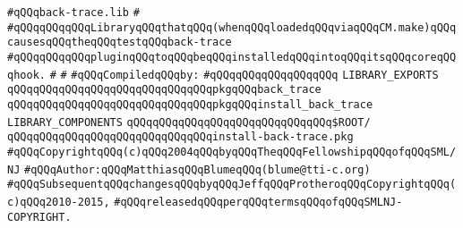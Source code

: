 \label{src/app/debug/back-trace.lib}
\verb|#qQQqback-trace.lib|\newline
\verb|#|\newline
\verb|#qQQqqQQqqQQqLibraryqQQqthatqQQq(whenqQQqloadedqQQqviaqQQqCM.make)qQQqcausesqQQqtheqQQqtestqQQqback-trace|\newline
\verb|#qQQqqQQqqQQqpluginqQQqtoqQQqbeqQQqinstalledqQQqintoqQQqitsqQQqcoreqQQqhook.|\newline
\verb|#|\newline
\verb|#|\newline
\newline
\verb|#qQQqCompiledqQQqby:|\newline
\verb|#qQQqqQQqqQQqqQQqqQQq|\newline
\newline
\newline
\newline
\verb|LIBRARY_EXPORTS|\newline
\newline
\verb|qQQqqQQqqQQqqQQqqQQqqQQqqQQqqQQqpkgqQQqback_trace|\newline
\verb|qQQqqQQqqQQqqQQqqQQqqQQqqQQqqQQqpkgqQQqinstall_back_trace|\newline
\newline
\newline
\newline
\verb|LIBRARY_COMPONENTS|\newline
\newline
\verb|qQQqqQQqqQQqqQQqqQQqqQQqqQQqqQQq$ROOT/|\newline
\verb|qQQqqQQqqQQqqQQqqQQqqQQqqQQqqQQqinstall-back-trace.pkg|\newline
\newline
\newline
\verb|#qQQqCopyrightqQQq(c)qQQq2004qQQqbyqQQqTheqQQqFellowshipqQQqofqQQqSML/NJ|\newline
\verb|#qQQqAuthor:qQQqMatthiasqQQqBlumeqQQq(blume@tti-c.org)|\newline
\verb|#qQQqSubsequentqQQqchangesqQQqbyqQQqJeffqQQqProtheroqQQqCopyrightqQQq(c)qQQq2010-2015,|\newline
\verb|#qQQqreleasedqQQqperqQQqtermsqQQqofqQQqSMLNJ-COPYRIGHT.|\newline

